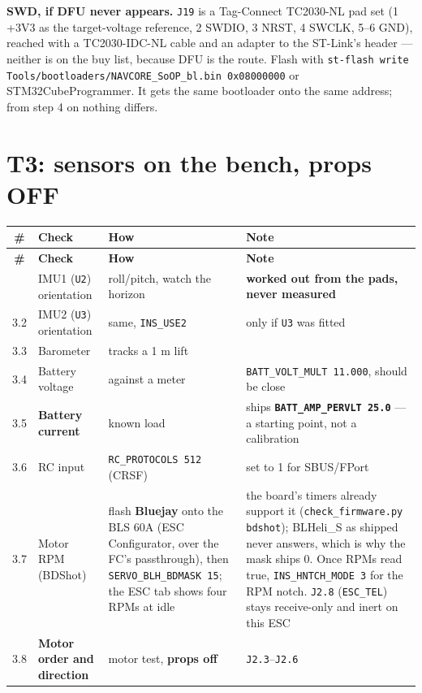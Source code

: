 \documentclass[11pt,a4paper]{article}
\newcommand{\file}[1]{\texttt{\small #1}}
\newcommand{\cmd}[1]{\texttt{\small #1}}
\begin{document}
\textbf{SWD, if DFU never appears.} \file{J19} is a Tag-Connect TC2030-NL pad set (1 +3V3 as
the target-voltage reference, 2 SWDIO, 3 NRST, 4 SWCLK, 5--6 GND), reached with a
TC2030-IDC-NL cable and an adapter to the ST-Link's header --- neither is on the buy list,
because DFU is the route. Flash with
\cmd{st-flash write Tools/bootloaders/NAVCORE\_SoOP\_bl.bin 0x08000000} or
STM32CubeProgrammer. It gets the same bootloader onto the same address; from step 4 on
nothing differs.

\section{T3: sensors on the bench, props OFF}

\begin{longtable}{@{}cP{0.21\textwidth}P{0.33\textwidth}P{0.33\textwidth}@{}}
\toprule
\textbf{\#} & \textbf{Check} & \textbf{How} & \textbf{Note} \\
\midrule
\endfirsthead
\toprule
\textbf{\#} & \textbf{Check} & \textbf{How} & \textbf{Note} \\
\midrule
\endhead
\bottomrule
{} & IMU1 (\file{U2}) orientation & roll/pitch, watch the horizon & \textbf{worked out from the
pads, never measured} \\
3.2 & IMU2 (\file{U3}) orientation & same, \file{INS\_USE2} & only if \file{U3} was fitted \\
3.3 & Barometer & tracks a 1 m lift & \\
3.4 & Battery voltage & against a meter & \file{BATT\_VOLT\_MULT 11.000}, should be close \\
3.5 & \textbf{Battery current} & known load & ships \textbf{\file{BATT\_AMP\_PERVLT 25.0}} --- a
starting point, not a calibration \\
3.6 & RC input & \file{RC\_PROTOCOLS 512} (CRSF) & set to 1 for SBUS/FPort \\
3.7 & Motor RPM (BDShot) & flash \textbf{Bluejay} onto the BLS 60A (ESC Configurator,
over the FC's passthrough), then \file{SERVO\_BLH\_BDMASK 15}; the ESC tab shows four RPMs at
idle & the board's timers already support it (\file{check\_firmware.py bdshot}); BLHeli\_S as shipped
never answers, which is why the mask ships 0. Once RPMs read true, \file{INS\_HNTCH\_MODE 3}
for the RPM notch. \file{J2.8} (\file{ESC\_TEL}) stays receive-only and inert on this ESC \\
3.8 & \textbf{Motor order and direction} & motor test, \textbf{props off} & \file{J2.3}--\file{J2.6}

\end{longtable}
\end{document}

